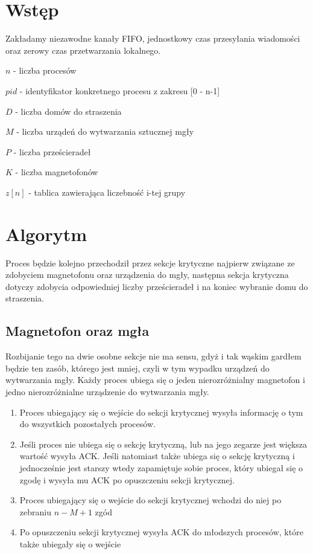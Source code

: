 \documentclass{article}
\begin{document}


\section{Wstęp}
Zakładamy niezawodne kanały FIFO, jednostkowy czas przesyłania wiadomości oraz zerowy czas przetwarzania lokalnego.
\begin{tightlist}
    \item $n$ - liczba procesów
    \item $pid$ - identyfikator konkretnego procesu z zakresu [0 - n-1]
    \item $D$ - liczba domów do straszenia
    \item $M$ - liczba urządeń do wytwarzania sztucznej mgły
    \item $P$ - liczba prześcieradeł
    \item $K$ - liczba magnetofonów
    \item $z[n]$ - tablica zawierająca liczebność i-tej grupy
\end{tightlist}

\section{Algorytm}
Proces będzie kolejno przechodził przez sekcje krytyczne najpierw związane ze zdobyciem magnetofonu oraz urządzenia do mgły, następna sekcja krytyczna dotyczy zdobycia odpowiedniej liczby prześcieradeł i na koniec wybranie domu do straszenia.
\subsection{Magnetofon oraz mgła}
Rozbijanie tego na dwie osobne sekcje nie ma sensu, gdyż i tak wąskim gardłem będzie ten zasób, którego jest mniej, czyli w tym wypadku urządzeń do wytwarzania mgły. Każdy proces ubiega się o jeden nierozróżnialny magnetofon i jedno nierozróżnialne urządzenie do wytwarzania mgły.
\begin{enumerate}
    \item Proces ubiegający się o wejście do sekcji krytycznej wysyła informację o tym do wszystkich pozostałych procesów. 
    \item Jeśli proces nie ubiega się o sekcję krytyczną, lub na jego zegarze jest większa wartość wysyła ACK. Jeśli natomiast także ubiega się o sekcję krytyczną i jednocześnie jest starszy wtedy zapamiętuje sobie proces, który ubiegał się o zgodę i wysyła mu ACK po opuszczeniu sekcji krytycznej.
    \item Proces ubiegający się o wejście do sekcji krytycznej wchodzi do niej po zebraniu $n - M + 1$ zgód
    \item Po opuszczeniu sekcji krytycznej wysyła ACK do młodszych procesów, które także ubiegały się o wejście
\end{enumerate}
\end{document}
